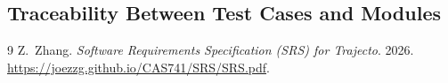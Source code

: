 \documentclass[12pt, titlepage]{article}
\providecommand{\wss}[1]{}
\begin{document}

					
					
					
					




\subsection{Traceability Between Test Cases and Modules}

\wss{Provide evidence that all modules have been considered.}
				


\begin{thebibliography}{9}
Z.~Zhang.
\emph{Software Requirements Specification (SRS) for Trajecto}.
2026.
\href{https://joezzg.github.io/CAS741/SRS/SRS.pdf}{https://joezzg.github.io/CAS741/SRS/SRS.pdf}.
\end{thebibliography}






\end{document}
